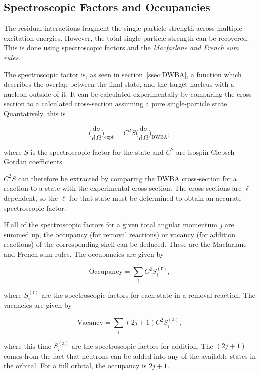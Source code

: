 \subsection{Spectroscopic Factors and Occupancies}

The residual interactions fragment the single-particle strength across multiple excitation energies. However, the total single-particle strength can be recovered. This is done using spectroscopic factors and the \textit{Macfarlane and French sum rules}.

The spectroscopic factor is, as seen in section~\ref{ssec:DWBA}, a function which describes the overlap between the final state, and the target nucleus with a nucleon outside of it. It can be calculated experimentally by comparing the cross-section to a calculated cross-section assuming a pure single-particle state. Quantatively, this is

\begin{equation}
\bigg ( \frac{\mathrm{d} \sigma}{\mathrm{d} \Omega} \bigg )_{\mathrm{expt}} = C^2S \bigg ( \frac{\mathrm{d} \sigma}{\mathrm{d} \Omega} \bigg )_{\mathrm{DWBA}}\mathrm{,}
\end{equation}

where $S$ is the spectroscopic factor for the state and $C^2$ are isospin Clebsch-Gordan coefficients.

$C^2S$ can therefore be extracted by comparing the DWBA cross-section for a reaction to a state with the experimental cross-section. The cross-sections are $\ell$ dependent, so the $\ell$ for that state must be determined to obtain an accurate spectroscopic factor.

If all of the spectroscopic factors for a given total angular momentum $j$ are summed up, the occupancy (for removal reactions) or vacancy (for addition reactions) of the corresponding shell  can be deduced. These are the Macfarlane and French sum rules\cite{macfarlanefrench}. The occupancies are given by

\begin{equation}
\mathrm{Occupancy} = \sum_{i}C^2S_i^{(\mathrm{r})}\mathrm{,}
\end{equation}

where $S_i^{(\mathrm{r})}$ are the spectroscopic factors for each state in a removal reaction. The vacancies are given by

\begin{equation}
\mathrm{Vacancy} = \sum_{i}(2j+1)C^2S_i^{(\mathrm{a})}\mathrm{,}
\end{equation}

where this time $S_i^{(\mathrm{a})}$ are the spectroscopic factors for addition. The $(2j + 1)$ comes from the fact that neutrons can be added into any of the available states in the orbital. For a full orbital, the occupancy is $2j + 1$.